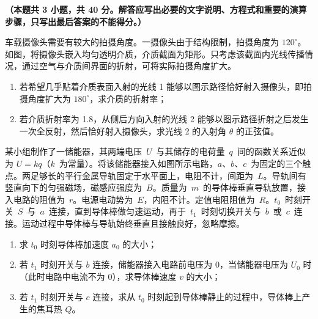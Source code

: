 
\textbf{（本题共 3 小题，共 40 分。解答应写出必要的文字说明、方程式和重要的演算步骤，只写出最后答案的不能得分。）}

\begin{question}
车载摄像头需要有较大的拍摄角度。一摄像头由于结构限制，拍摄角度为 $120^{\circ}$。如图，将摄像头嵌入均匀透明介质，介质截面为矩形。只考虑该截面内光线传播情况，通过空气与介质间界面的折射，可将实际拍摄角度扩大。


\begin{enumerate}[leftmargin=2em, label=(\arabic*)]
  \item 若希望几乎贴着介质表面入射的光线 1 能够以图示路径恰好射入摄像头，即拍摄角度扩大为 $180^{\circ}$，求介质的折射率；
  \item 若介质折射率为 1.8，从侧后方向入射的光线 2 能够以图示路径折射之后发生一次全反射，然后恰好射入摄像头，求光线 2 的入射角 $\theta$ 的正弦值。
\end{enumerate}
\end{question}

\begin{question}
某小组制作了一储能器，其两端电压~$U$~与其储存的电荷量~$q$~间的函数关系近似为 $U=kq$（$k$~为常量）。将该储能器接入如图所示电路，$a$、$b$、$c$~为固定的三个触点。两足够长的平行金属导轨固定于水平面上，电阻不计，间距为~$L$。导轨间有竖直向下的匀强磁场，磁感应强度为~$B$。质量为~$m$~的导体棒垂直导轨放置，接入电路的阻值为~$r$。电源电动势为~$E$，内阻不计。定值电阻阻值为~$R$。$t_{0}$~时刻开关~$S$~与~$a$~连接，直到导体棒做匀速运动，再于~$t_{1}$~时刻切换开关与~$b$~或~$c$~连接。运动过程中导体棒与导轨始终垂直且接触良好，忽略摩擦。


\begin{enumerate}[leftmargin=2em, label=(\arabic*)]
  \item 求 $t_{0}$ 时刻导体棒加速度 $a_{0}$ 的大小；
  \item 若 $t_{1}$ 时刻开关与 $b$ 连接，储能器接入电路前电压为 0，当储能器电压为 $U_{0}$ 时（此时电路中电流不为 0），求导体棒速度 $v$ 的大小；
  \item 若 $t_{1}$ 时刻开关与 $c$ 连接，求从 $t_{0}$ 时刻起到导体棒静止的过程中，导体棒上产生的焦耳热 $Q$。
\end{enumerate}
\end{question}

